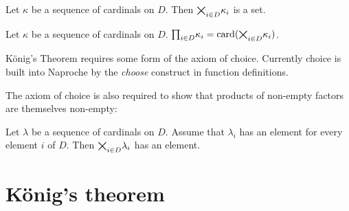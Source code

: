\documentclass{article}
\newcommand{\val}[2]{#1_{#2}}
\newcommand{\card}[1]{\operatorname{card}(#1)}
\begin{document}
\begin{forthel}
    \begin{axiom}
      Let $\kappa$ be a sequence of cardinals on $D$.
      Then $\ProdSet{\kappa}{D}$ is a set.
    \end{axiom}

    \begin{definition}
      Let $\kappa$ be a sequence of cardinals on $D$.
      $\Prod{\kappa}{D} = \card{\ProdSet{\kappa}{D}}$.
    \end{definition}
\end{forthel}

König's Theorem requires some form of the axiom of choice.
Currently choice is built into Naproche by the {\em choose}
construct in function definitions.

The axiom of choice is also required to show that products
of non-empty factors are themselves non-empty:

\begin{forthel}

    \begin{axiom}[Choice]
      Let $\lambda$ be a sequence of cardinals on $D$.
      Assume that $\val{\lambda}{i}$
     has an element for every element $i$ of $D$.
     Then $\ProdSet{\lambda}{D}$ has an element.
    \end{axiom}

\end{forthel}


\section{König's theorem}
\end{document}
